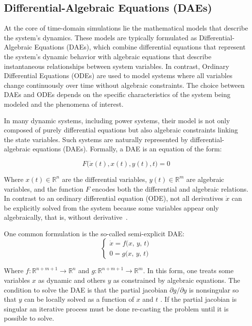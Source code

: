 \subsection{Differential-Algebraic Equations (DAEs)}

At the core of time-domain simulations lie the mathematical models that describe the system's dynamics. These models are typically formulated as Differential-Algebraic Equations
(DAEs), which combine differential equations that represent the system's dynamic behavior with algebraic equations that describe instantaneous relationships between system variables. 
In contrast, Ordinary Differential Equations (ODEs) are used to model systems where all variables change continuously over time without algebraic constraints. 
The choice between DAEs and ODEs depends on the specific characteristics of the system being modeled and the phenomena of interest.

In many dynamic systems, including power systems, their model is not only composed of purely differential equations but also algebraic constraints linking the state
variables. Such systems are naturally represented by differential-algebraic equations (DAEs). Formally, a DAE is an equation of the form: 

\begin{equation}
  F\bigl(\dot{x}(t), x(t), y(t), t\bigr) = 0
\end{equation}


Where $x(t)\in \mathbb{R}^n$ are the differential variables, $y(t)\in \mathbb{R}^m$ are algebraic variables, and the function
 $F$ encodes both the differential and algebraic relations. 
In contrast to an ordinary differential equation (ODE), not all derivatives $\dot{x}$ can be explicitly solved from the system because some variables appear only 
algebraically, that is, without derivative~\cite{CasellaDAE}.

One common formulation is the so-called semi-explicit DAE:  
\begin{equation}
\begin{cases}
\dot x = f\bigl(x,\,y,\,t\bigr) \\
0 = g\bigl(x,\,y,\,t\bigr)
\end{cases}
\end{equation} 

Where $f\colon \mathbb{R}^{n+m+1} \to \mathbb{R}^n$ and $g\colon \mathbb{R}^{n+m+1} \to \mathbb{R}^m$. In this form, one treats some variables $x$ as dynamic and others $y$
as constrained by algebraic equations. The condition to solve the DAE is that the partial jacobian $\partial g / \partial y$ is nonsingular so that $y$ can be locally solved as
a function of $x$ and $t$ \cite{CasellaDAE}. If the partial jacobian is singular an iterative process must be done re-casting the problem until it is possible to solve.  

